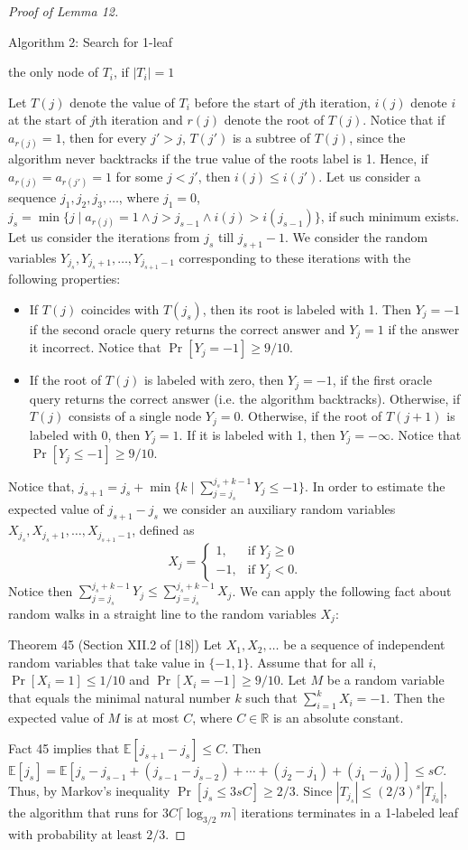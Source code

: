 \begin{proof}[Proof of Lemma 12]
\begin{authorclaim}{Algorithm 2: Search for 1-leaf}
\begin{algorithmic}
\State \Return the only node of $T_i$, if $|T_i|=1$
\end{algorithmic}
\end{authorclaim}
Let $T(j)$ denote the value of $T_i$ before the start of $j$th iteration, $i(j)$ denote $i$ at the start of $j$th iteration and $r(j)$ denote the root of $T(j)$. Notice that if $a_{r(j)}=1$, then for every $j'>j$, $T(j')$ is a subtree of $T(j)$, since the algorithm never backtracks if the true value of the roots label is 1. Hence, if $a_{r(j)}=a_{r(j')}=1$ for some $j<j'$, then $i(j)\le i(j')$.
Let us consider a sequence $j_1,j_2,j_3,\ldots$, where $j_1=0$, $j_s=\min\{j\mid a_{r(j)}=1\wedge j>j_{s-1}\wedge i(j)>i(j_{s-1})\}$, if such minimum exists.
Let us consider the iterations from $j_s$ till $j_{s+1}-1$. We consider the random variables $Y_{j_s},Y_{j_s+1},\ldots,Y_{j_{s+1}-1}$ corresponding to these iterations with the following properties:
\begin{itemize}
\item If $T(j)$ coincides with $T(j_s)$, then its root is labeled with 1. Then $Y_j=-1$ if the second oracle query returns the correct answer and $Y_j=1$ if the answer it incorrect. Notice that $\Pr[Y_j=-1]\ge9/10$.
\item If the root of $T(j)$ is labeled with zero, then $Y_j=-1$, if the first oracle query returns the correct answer (i.e. the algorithm backtracks). Otherwise, if $T(j)$ consists of a single node $Y_j=0$. Otherwise, if the root of $T(j+1)$ is labeled with 0, then $Y_j=1$. If it is labeled with 1, then $Y_j=-\infty$. Notice that $\Pr[Y_j\le-1]\ge9/10$.
\end{itemize}
Notice that, $j_{s+1}=j_s+\min\{k\mid\sum_{j=j_s}^{j_s+k-1}Y_j\le-1\}$. In order to estimate the expected value of $j_{s+1}-j_s$ we consider an auxiliary random variables $X_{j_s},X_{j_s+1},\ldots,X_{j_{s+1}-1}$, defined as
\[
X_j=\begin{cases}1,&\text{if }Y_j\ge0\\-1,&\text{if }Y_j<0.\end{cases}
\]
Notice then $\sum_{j=j_s}^{j_s+k-1}Y_j\le\sum_{j=j_s}^{j_s+k-1}X_j$. We can apply the following fact about random walks in a straight line to the random variables $X_j$:
\begin{authorclaim}{Theorem 45 (Section XII.2 of [18])}
Let $X_1,X_2,\ldots$ be a sequence of independent random variables that take value in $\{-1,1\}$. Assume that for all $i$, $\Pr[X_i=1]\le1/10$ and $\Pr[X_i=-1]\ge9/10$. Let $M$ be a random variable that equals the minimal natural number $k$ such that $\sum_{i=1}^kX_i=-1$. Then the expected value of $M$ is at most $C$, where $C\in\mathbb R$ is an absolute constant.
\end{authorclaim}
Fact 45 implies that $\mathbb E[j_{s+1}-j_s]\le C$. Then $\mathbb E[j_s]=\mathbb E[j_s-j_{s-1}+(j_{s-1}-j_{s-2})+\cdots+(j_2-j_1)+(j_1-j_0)]\le sC$. Thus, by Markov's inequality $\Pr[j_s\le3sC]\ge2/3$. Since $|T_{j_s}|\le(2/3)^s|T_{j_0}|$, the algorithm that runs for $3C\lceil\log_{3/2}m\rceil$ iterations terminates in a 1-labeled leaf with probability at least $2/3$.
\end{proof}
